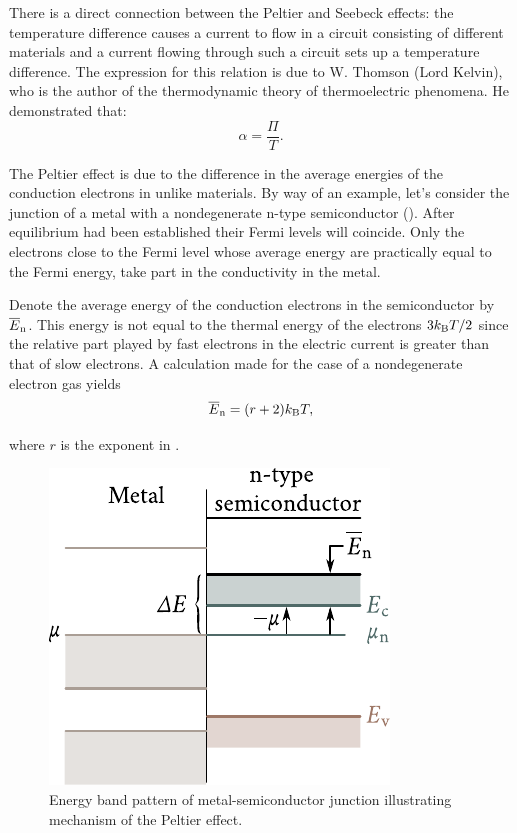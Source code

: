 There is a direct connection between the Peltier and Seebeck effects: the temperature difference causes a current to flow in a circuit consisting of different materials and a current flowing through such a circuit sets up a temperature difference. The expression for this relation is due to W. Thomson (Lord Kelvin), who is the author of the thermodynamic theory of thermoelectric phenomena. He demonstrated that:
\begin{equation}\label{eq:9_22}
    \alpha = \frac{\Pi}{T}.
\end{equation}

The Peltier effect is due to the difference in the average energies of the conduction electrons in unlike materials. By way of an example, let's consider the junction of a metal with a nondegenerate n-type semiconductor (). After equilibrium had been established their Fermi levels will coincide. Only the electrons close to the Fermi level whose average energy are practically equal to the Fermi energy, take part in the conductivity in the metal.

Denote the average energy of the conduction electrons in the semiconductor by $\overline{E}_{\text{n}}$. This energy is not equal to the thermal energy of the electrons $3k_{\text{B}}T/2$ since the relative part played by fast electrons in the electric current is greater than that of slow electrons. A calculation made for the case of a nondegenerate electron gas yields
\begin{equation}\label{eq:9_23}
    \overline{E}_{\text{n}} = (r+2) k_{\text{B}} T,
\end{equation}

\noindent
where $r$ is the exponent in .

\begin{figure}[t]
	\begin{center}
		\includegraphics[scale=1]{figures/ch_09/fig_9_4.pdf}
		\caption[]{Energy band pattern of metal-semiconductor junction illustrating mechanism of the Peltier effect.}
		\label{fig:9_4}
	\end{center}
	\vspace{-0.8cm}
\end{figure}

